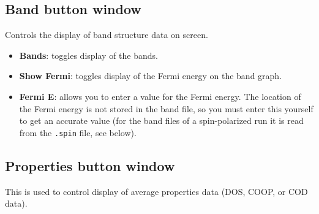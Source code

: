 \subsection{Band button window}

Controls the display of band structure data on screen.

\begin{itemize}
\item {\bf Bands}: toggles display of the bands.

\item {\bf Show Fermi}: toggles display of the Fermi energy on the
band graph.

\item {\bf Fermi E}: allows you to enter a value for the Fermi energy.
The location of the Fermi energy is not stored in the band file, so
you must enter this yourself to get an accurate value (for the band
files of a spin-polarized run it is read from the {\tt .spin} file,
see below).
\end{itemize}

\subsection{Properties button window}

This is used to control display of average properties data (DOS, COOP,
or COD data).  

